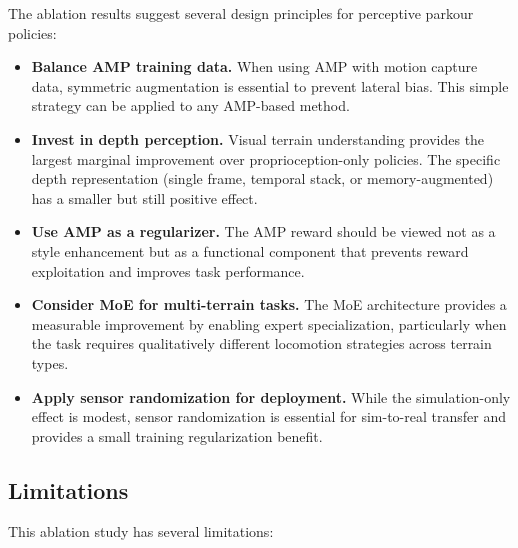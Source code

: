 The ablation results suggest several design principles for perceptive parkour policies:

\begin{itemize}
    \item \textbf{Balance AMP training data.} When using AMP with motion capture data, symmetric augmentation is essential to prevent lateral bias. This simple strategy can be applied to any AMP-based method.
    \item \textbf{Invest in depth perception.} Visual terrain understanding provides the largest marginal improvement over proprioception-only policies. The specific depth representation (single frame, temporal stack, or memory-augmented) has a smaller but still positive effect.
    \item \textbf{Use AMP as a regularizer.} The AMP reward should be viewed not as a style enhancement but as a functional component that prevents reward exploitation and improves task performance.
    \item \textbf{Consider MoE for multi-terrain tasks.} The MoE architecture provides a measurable improvement by enabling expert specialization, particularly when the task requires qualitatively different locomotion strategies across terrain types.
    \item \textbf{Apply sensor randomization for deployment.} While the simulation-only effect is modest, sensor randomization is essential for sim-to-real transfer and provides a small training regularization benefit.
\end{itemize}

\subsection{Limitations}

This ablation study has several limitations:


